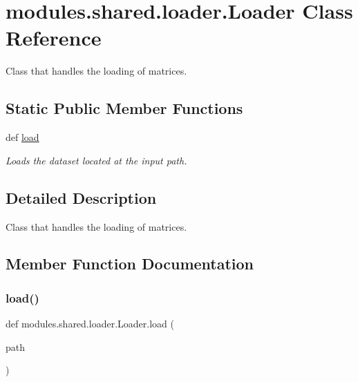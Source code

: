 \hypertarget{classmodules_1_1shared_1_1loader_1_1_loader}{}\section{modules.\+shared.\+loader.\+Loader Class Reference}
\label{classmodules_1_1shared_1_1loader_1_1_loader}


Class that handles the loading of matrices.  


\subsection*{Static Public Member Functions}
\begin{DoxyCompactItemize}
\item 
def \mbox{\hyperlink{classmodules_1_1shared_1_1loader_1_1_loader_a05b073bcb91c647ea4e6b47c71f40e94}{load}}
\begin{DoxyCompactList}\small\item\em Loads the dataset located at the input path. \end{DoxyCompactList}\end{DoxyCompactItemize}


\subsection{Detailed Description}
Class that handles the loading of matrices. 

\subsection{Member Function Documentation}
\mbox{\label{classmodules_1_1shared_1_1loader_1_1_loader_a05b073bcb91c647ea4e6b47c71f40e94}} 
\subsubsection{\texorpdfstring{load()}{load()}}
{\footnotesize\ttfamily def modules.\+shared.\+loader.\+Loader.\+load (\begin{DoxyParamCaption}\item[{}]{path }\end{DoxyParamCaption})\hspace{0.3cm}{\ttfamily [static]}}



